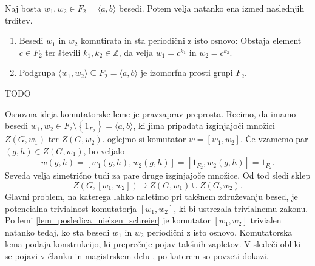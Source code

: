 

\begin{lema}
\label{lem_posledica_nielsen_schreier}
Naj bosta $w_1, w_2 \in F_2 = \langle a, b \rangle$ besedi. Potem velja natanko ena izmed naslednjih trditev. \begin{enumerate}
    \item Besedi $w_1$ in $w_2$ komutirata in sta periodični z isto osnovo: Obstaja element $c \in F_2$ ter števili $k_1, k_2 \in \mathbb{Z}$, da velja $w_1= c^{k_1}$ in $w_2 = c^{k_2}$. 
    \item Podgrupa $\langle w_1, w_2 \rangle \subseteq F_2 = \langle a, b \rangle$ je izomorfna prosti grupi $F_2$.
\end{enumerate}
\end{lema}
\begin{dokaz}
    TODO
\end{dokaz}

Osnovna ideja komutatorske leme je pravzaprav preprosta. Recimo, da imamo besedi $w_1, w_2 \in F_2 \setminus \left\{ 1_{F_2}\right\}  = \langle a,b \rangle$, ki jima pripadata izginjajoči množici $Z(G, w_1)$ ter $Z(G, w_2)$.
oglejmo si komutator $w = [w_1, w_2]$. Če vzamemo par $(g, h) \in Z(G, w_1)$, bo veljalo \begin{equation*}
w(g,h) = [w_1(g,h), w_2(g,h)] = [1_{F_2}, w_2(g,h)] = 1_{F_2}.
\end{equation*}  
  Seveda velja simetrično tudi za pare druge izginjajoče množice. Od tod sledi sklep \begin{equation*}
  Z(G, [w_1, w_2]) \supseteq Z(G, w_1) \cup Z(G, w_2).
  \end{equation*}  
Glavni problem, na katerega lahko naletimo pri takšnem združevanju besed, je potencialna trivialnost komutatorja $[w_1, w_2]$, ki bi ustrezala trivialnemu zakonu.
Po lemi \ref{lem_posledica_nielsen_schreier} je komutator $[w_1, w_2]$ trivialen natanko tedaj, ko sta besedi $w_1$ in $w_2$ periodični z isto osnovo. 
Komutatorska lema podaja konstrukcijo, ki preprečuje pojav takšnih zapletov. V sledeči obliki se pojavi v članku \cite{Kozma_Thom_2016} in magistrskem delu \cite{Schneider_2016}, po katerem so povzeti dokazi.


